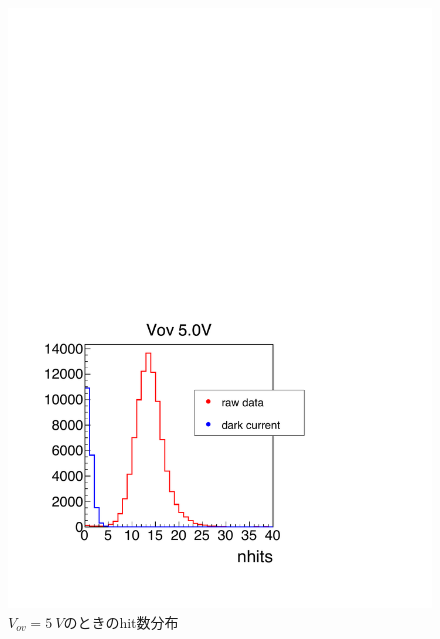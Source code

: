 \documentclass[uplatex, titlepage, dvipdfmx, 12pt, a4paper]{jsreport}
\begin{document}
\begin{figure}[hbtp]
  \begin{center} 
    \includegraphics[scale=0.4, clip]{image/Vov5_nhits.pdf}
    \caption{$V_{ov}=\SI{5}{V}$のときのhit数分布} 
    \label{fig:nhits} 
  \end{center}
\end{figure}
\end{document}
